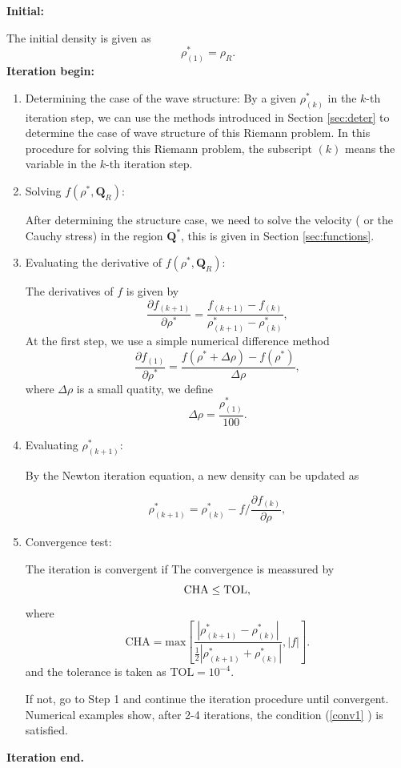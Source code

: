 \documentclass{article}
\numberwithin{equation}{section}
\numberwithin{table}{section}
\begin{document}
\noindent  \textbf{Initial:}

	The initial density is  given as
\begin{equation}
\rho_{(1)}^* = \rho_R.
\end{equation}
\textbf{Iteration begin:}
\begin{enumerate}[Step 1]
  \item Determining the case of the wave structure:
	By a given  $\rho _{(k)}^*$ in the $k$-th iteration step, we can use the methods introduced in Section \ref{sec:deter} to determine the case of wave structure of this Riemann problem. In this procedure for solving this Riemann problem, the subscript $(k)$ means the variable in the $k$-th  iteration step.


  \item Solving $f(\rho^*,\mathbf{Q}_R)$: 
	
	After determining the structure case, we need to solve the velocity ( or  the Cauchy stress) in  the region $\mathbf{Q}^*$, this is  given in Section \ref{sec:functions}.

  \item Evaluating the derivative of  $f(\rho^*,\mathbf{Q}_R)$:

The derivatives of $f$ is  given by
\begin{equation}
  \frac{\partial f_{(k+1)}}{\partial \rho^*} = \frac{f_{(k+1)}-f_{(k)}}{\rho_{(k+1)}^* - \rho^*_{(k)}},
\end{equation}
At the first step, we use a simple  numerical difference  method
\begin{equation}
  \frac{\partial f_{(1)}}{\partial \rho^*} = \frac{f(\rho^*+\Delta \rho)-f(\rho^*)}{\Delta \rho},
\end{equation}
where $\Delta \rho$ is a small quatity, we define
\begin{equation}
  \Delta \rho = \frac{\rho_{(1)}^*}{100}.
\end{equation}
  \item  Evaluating  $\rho^*_{(k+1)}$: 
	
	By the Newton iteration equation, a new density can be updated as

\begin{equation}
 \rho^*_{(k+1)} = \rho^*_{(k)}- f/\frac{\partial f_{(k)}}{\partial \rho},
\end{equation}

\item Convergence test:


The iteration is convergent if
The  convergence is meassured by
\begin{equation}{\label{conv1}}
  \text{CHA} \le \text{TOL},
\end{equation}
where
\begin{equation}
\text{CHA} = \text{max} \left[
\frac{|\rho_{(k+1)}^*- \rho_{(k)}^*|}{\frac{1}{2}|\rho_{(k+1)}^*+\rho_{(k)}^*|},|f|\right].
\end{equation}
and the tolerance is taken as $\text{TOL} = 10^{-4}$.

If not, go to Step 1 and continue the iteration procedure until convergent. Numerical examples show, after 2-4 iterations, the condition (\ref{conv1} ) is satisfied.
\end{enumerate}
\textbf{Iteration end.}
\end{document}
